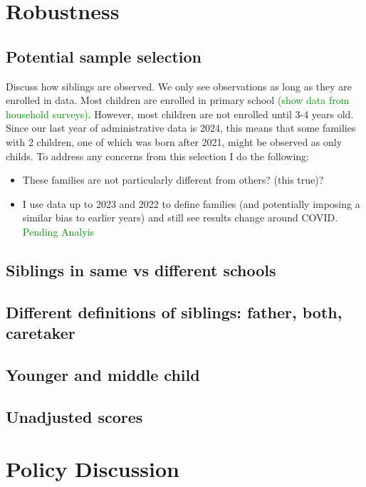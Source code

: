 \section{Robustness}\label{sec:robustness}

\subsection{Potential sample selection}

Discuss how siblings are observed. We only see observations as long as they are enrolled in data. Most children are enrolled in primary school \textcolor{green}{(show data from household surveys)}. However, most children are not enrolled until 3-4 years old. Since our last year of administrative data is 2024, this means that some families with 2 children, one of which was born after 2021, might be observed as only childs. To address any concerns from this selection I do the following:

\begin{itemize}
    \item These families are not particularly different from others? (this true)?
    \item I use data up to 2023 and 2022 to define families (and potentially imposing a similar bias to earlier years) and still see results change around COVID. \textcolor{green}{Pending Analyis}
\end{itemize}


\subsection{Siblings in same vs different schools}

\subsection{Different definitions of siblings: father, both, caretaker}

\subsection{Younger and middle child}

\subsection{Unadjusted scores}

\section{Policy Discussion}\label{sec:policy}


